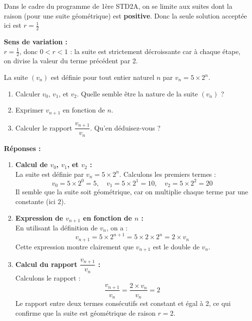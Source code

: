 \documentclass[a4paper,12pt]{article}
\begin{document}
        Dans le cadre du programme de 1ère STD2A, on se limite aux suites dont la raison (pour une suite géométrique) est \textbf{positive}.
        Donc la seule solution acceptée ici est $r = \frac{1}{2}$
        
        \textbf{Sens de variation :} \\
        $r = \frac{1}{2}$, donc $0 < r < 1$ : la suite est strictement décroissante car à chaque étape, on divise la valeur du terme précédent par 2. \\
        
        \bigskip
        
        \begin{tcolorbox}[colback=gray!10, colframe=gray!50, title=Exercice \textbf{135} page 133]
        La suite $(v_n)$ est définie pour tout entier naturel $n$ par $v_n = 5 \times 2^n$.
        \begin{enumerate}
            \item Calculer $v_0$, $v_1$, et $v_2$. Quelle semble être la nature de la suite $(v_n)$ ?
            \item Exprimer $v_{n+1}$ en fonction de $n$.
            \item Calculer le rapport $\dfrac{v_{n+1}}{v_n}$. Qu'en déduisez-vous ?
        \end{enumerate}
        \end{tcolorbox}
        
        \bigskip
        
        \textbf{Réponses :}
        
        \begin{enumerate}
            \item \textbf{Calcul de $v_0$, $v_1$, et $v_2$ :} \\
            La suite est définie par $v_n = 5 \times 2^n$. Calculons les premiers termes :
            \[
            v_0 = 5 \times 2^0 = 5, \quad v_1 = 5 \times 2^1 = 10, \quad v_2 = 5 \times 2^2 = 20
            \]
            Il semble que la suite soit géométrique, car on multiplie chaque terme par une constante (ici $2$).
        
            \item \textbf{Expression de $v_{n+1}$ en fonction de $n$ :} \\
            En utilisant la définition de $v_n$, on a :
            \[
            v_{n+1} = 5 \times 2^{n+1} = 5 \times 2 \times 2^n = 2 \times v_n
            \]
            Cette expression montre clairement que $v_{n+1}$ est le double de $v_n$.
        
            \item \textbf{Calcul du rapport $\dfrac{v_{n+1}}{v_n}$ :} \\
            Calculons le rapport :
            \[
            \dfrac{v_{n+1}}{v_n} = \dfrac{2 \times v_n}{v_n} = 2
            \]
            Le rapport entre deux termes consécutifs est constant et égal à 2, ce qui confirme que la suite est géométrique de raison $r = 2$.
        \end{enumerate}
        
\end{document}
